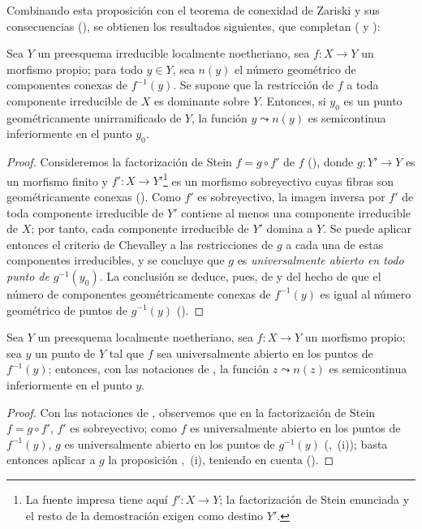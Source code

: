 Combinando esta proposición con el teorema de conexidad de Zariski y sus consecuencias (), se obtienen los resultados siguientes, que completan ( y ):

\begin{proposition}[15.5.3]
\label{IV.15.5.3}
Sea $Y$ un preesquema irreducible localmente noetheriano, sea $f:X\to Y$ un morfismo propio; para todo $y\in Y$, sea $n(y)$ el número geométrico de componentes conexas  de $f^{-1}(y)$.
Se supone que la restricción de $f$ a toda componente irreducible de $X$ es dominante sobre $Y$.
Entonces, si $y_0$ es un punto geométricamente unirramificado de $Y$, la función $y\leadsto n(y)$ es semicontinua inferiormente en el punto $y_0$.
\end{proposition}

\begin{proof}
Consideremos la factorización de Stein $f=g\circ f'$ de $f$ (), donde $g:Y'\to Y$ es un morfismo finito y $f':X\to Y'$\footnote{La fuente impresa tiene aquí $f':X\to Y$; la factorización de Stein enunciada y el resto de la demostración exigen como destino $Y'$.} es un morfismo sobreyectivo cuyas fibras son geométricamente conexas ().
Como $f'$ es sobreyectivo, la imagen inversa por $f'$ de toda componente irreducible de $Y'$ contiene al menos una componente irreducible de $X$; por tanto, cada componente irreducible de $Y'$ domina a $Y$.
Se puede aplicar entonces el criterio de Chevalley  a las restricciones de $g$ a cada una de estas componentes irreducibles, y se concluye que $g$ es \emph{universalmente abierto en todo punto de} $g^{-1}(y_0)$.
La conclusión se deduce, pues, de  y del hecho de que el número de componentes geométricamente conexas de $f^{-1}(y)$ es igual al número geométrico de puntos de $g^{-1}(y)$ ().
\end{proof}

\begin{corollary}[15.5.4]
\label{IV.15.5.4}
Sea $Y$ un preesquema localmente noetheriano, sea $f:X\to Y$ un morfismo propio; sea $y$ un punto de $Y$ tal que $f$ sea universalmente abierto en los puntos de $f^{-1}(y)$;
entonces, con las notaciones de , la función $z\leadsto n(z)$ es semicontinua inferiormente en el punto $y$.
\end{corollary}

\begin{proof}
Con las notaciones de , observemos que en la factorización de Stein $f=g\circ f'$, $f'$ es sobreyectivo; como $f$ es universalmente abierto en los puntos de $f^{-1}(y)$, $g$ es universalmente abierto en los puntos de $g^{-1}(y)$ (,~(i)); basta entonces aplicar a $g$ la proposición ,~(i), teniendo en cuenta ().
\end{proof}

